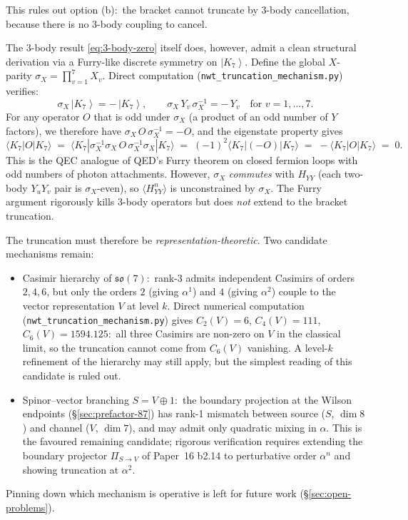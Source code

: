 \documentclass[11pt]{article}
\newcommand{\so}{\mathfrak{so}}
\newcommand{\ket}[1]{\left|#1\right\rangle}
\begin{document}
This rules out option (b):\ the bracket cannot truncate by
3-body cancellation, because there is no 3-body coupling to
cancel.

The 3-body result \eqref{eq:3-body-zero} itself does, however, admit
a clean structural derivation via a Furry-like discrete symmetry on
$\ket{K_7}$.  Define the global $X$-parity
$\sigma_X = \prod_{v=1}^{7} X_v$.  Direct computation
(\texttt{nwt\_truncation\_mechanism.py}) verifies:
\begin{equation}
  \sigma_X\,\ket{K_7} = -\,\ket{K_7},
  \qquad
  \sigma_X\, Y_v\, \sigma_X^{-1} = -\,Y_v
  \quad\text{for } v = 1, \ldots, 7.
\end{equation}
For any operator $O$ that is odd under $\sigma_X$ (a product of an
odd number of $Y$ factors), we therefore have
$\sigma_X\, O\, \sigma_X^{-1} = -O$, and the eigenstate property
gives
\begin{equation}
  \langle K_7 | O | K_7 \rangle
  \;=\; \langle K_7 | \sigma_X^{-1} \sigma_X\, O\, \sigma_X^{-1} \sigma_X | K_7 \rangle
  \;=\; (-1)^2\langle K_7 | (-O) | K_7 \rangle
  \;=\; -\langle K_7 | O | K_7 \rangle
  \;=\; 0.
\end{equation}
This is the QEC analogue of QED's Furry theorem on closed fermion
loops with odd numbers of photon attachments.  However, $\sigma_X$
\emph{commutes} with $H_{YY}$ (each two-body $Y_uY_v$ pair is
$\sigma_X$-even), so $\langle H_{YY}^n\rangle$ is unconstrained by
$\sigma_X$.  The Furry argument rigorously kills 3-body operators
but does \emph{not} extend to the bracket truncation.

The truncation must therefore be \emph{representation-theoretic}.
Two candidate mechanisms remain:
\begin{itemize}
\item Casimir hierarchy of $\so(7)$:\ rank-3 admits independent
  Casimirs of orders $2, 4, 6$, but only the orders $2$ (giving
  $\alpha^1$) and $4$ (giving $\alpha^2$) couple to the vector
  representation $V$ at level $k$.  Direct numerical computation
  (\texttt{nwt\_truncation\_mechanism.py}) gives
  $C_2(V) = 6$, $C_4(V) = 111$, $C_6(V) = 1594.125$:\ all three
  Casimirs are non-zero on $V$ in the classical limit, so the
  truncation cannot come from $C_6(V)$ vanishing.  A level-$k$
  refinement of the hierarchy may still apply, but the simplest
  reading of this candidate is ruled out.
\item Spinor--vector branching $S = V \oplus 1$:\ the boundary
  projection at the Wilson endpoints (\S\ref{sec:prefactor-87})
  has rank-1 mismatch between source ($S$, $\dim 8$) and channel
  ($V$, $\dim 7$), and may admit only quadratic mixing in $\alpha$.
  This is the favoured remaining candidate; rigorous verification
  requires extending the boundary projector $\Pi_{S \to V}$ of
  Paper~16 b2.14 to perturbative order $\alpha^n$ and showing
  truncation at $\alpha^2$.
\end{itemize}
Pinning down which mechanism is operative is left for future work
(\S\ref{sec:open-problems}).
\end{document}
